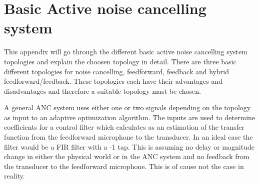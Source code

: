 \section{Basic Active noise cancelling system} \label{sec:BasicSystem}
This appendix will go through the different basic active noise cancelling system topologies and explain the choosen topology in detail. There are three basic different topologies for noise cancelling, feedforward, feedback and hybrid feedforward/feedback. These topologies each have their advantages and disadvantages and therefore a suitable topology must be chosen.

A general ANC system uses either one or two signals depending on the topology as input to an adaptive optimization algorithm. The inputs are used to determine coefficients for a control filter which calculates as an estimation of the transfer function from the feedforward microphone to the transducer. In an ideal case the filter would be a FIR filter with a -1 tap. This is assuming no delay or magnitude change in either the physical world or in the ANC system and no feedback from the transducer to the feedforward microphone. This is of cause not the case in reality. 




